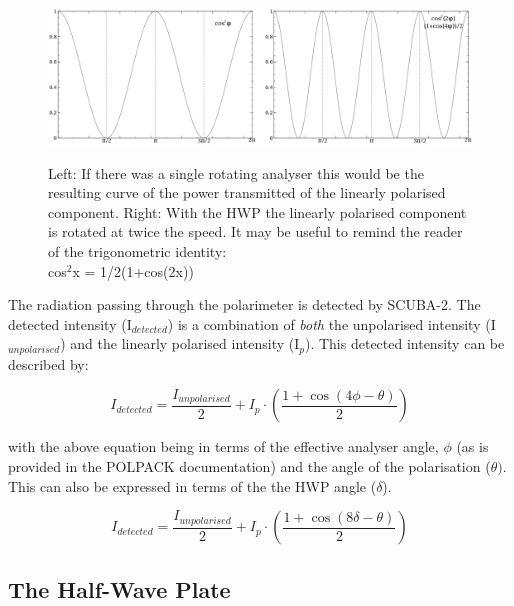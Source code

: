 \begin{figure}[t!]
\begin{center}
\includegraphics[width=0.95\linewidth]{hwp-modulation-basic.png}
\label{fig:hwp-modulation-basic}
\caption [Modulation by the HWP - basic description]{ Left: If there
  was a single rotating analyser this would be the resulting curve of
  the power transmitted of the linearly polarised component.
  Right: With the HWP the linearly polarised component is
  rotated at twice the speed. It may be useful to remind the reader of
  the trigonometric identity: \\ cos$^{2}$x = 1/2(1+cos(2x))}
\end{center}
\end{figure}


The radiation passing through the polarimeter is detected by
SCUBA-2. The detected intensity (I$_{detected}$) is a combination of
\emph{both} the unpolarised intensity (I$_{unpolarised}$) and the
linearly polarised intensity (I$_{p}$). This detected intensity can be
described by:

\begin{equation}
I_{detected} = \frac{I_{unpolarised}}{2}+ I_{p}\cdot\left(\frac{1+\cos(4\phi - \theta)}{2} \right)
\end{equation}

with the above equation being in terms of the effective analyser
angle, $\phi$ (as is provided in the POLPACK documentation) and
the angle of the polarisation ($\theta)$.
This can also be expressed in terms of the  the HWP angle ($\delta$).

\begin{equation}
I_{detected} = \frac{I_{unpolarised}}{2}+ I_{p}\cdot\left(\frac{1+\cos(8\delta - \theta)}{2} \right)
\end{equation}




\subsection*{The Half-Wave Plate}

